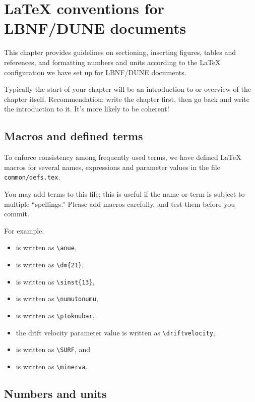 
\chapter{\LaTeX{} conventions for LBNF/DUNE documents}
\label{ch:latex-stds}

This chapter provides guidelines on sectioning, inserting figures, tables and references, and formatting numbers and units according to the \LaTeX{} configuration we have set up for LBNF/DUNE documents.

Typically the start of your chapter will be an introduction to or overview of the chapter itself. Recommendation: write the chapter first, then go back and write the introduction to it. It's more likely to be coherent!


\section{Macros and defined terms}
\label{sec:latex-terms}

To enforce consistency among frequently used terms, we have defined \LaTeX{} macros for several names, expressions and parameter values in the file \texttt{common/defs.tex}.  

You may add terms
to this file; this is useful if the name or term is subject
to multiple ``spellings.''  Please add macros carefully, and test them before you commit. 

For example,
\begin{itemize}
\item \anue is written as \verb|\anue|,
\item {} is written as \verb|\dm{21}|,
\item {} is written as \verb|\sinst{13}|,
\item \numutonumu is written as \verb|\numutonumu|,
\item \ptoknubar is written as \verb|\ptoknubar|,
\item the drift velocity parameter value \driftvelocity is written as \verb|\driftvelocity|,
\item \SURF is written as \verb|\SURF|, and
\item \minerva is written as \verb|\minerva|.
\end{itemize}

\section{Numbers and units}

